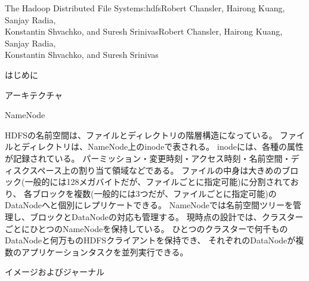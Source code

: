 \begin{aosachaptertoc}{The Hadoop Distributed File System}{s:hdfs}{Robert Chansler, Hairong Kuang, Sanjay Radia, \\ Konstantin Shvachko, and Suresh Srinivas}{Robert Chansler, Hairong Kuang, Sanjay Radia, \\ \hspace*{0.9cm} Konstantin Shvachko, and Suresh Srinivas}
\begin{aosasect1}{はじめに}
\end{aosasect1}

\begin{aosasect1}{アーキテクチャ}

\begin{aosasect2}{NameNode}

HDFSの名前空間は、ファイルとディレクトリの階層構造になっている。
ファイルとディレクトリは、NameNode上のinodeで表される。
inodeには、各種の属性が記録されている。
パーミッション・変更時刻・アクセス時刻・名前空間・ディスクスペース上の割り当て領域などである。
ファイルの中身は大きめのブロック(一般的には128メガバイトだが、ファイルごとに指定可能)に分割されており、
各ブロックを複数(一般的には3つだが、ファイルごとに指定可能)のDataNodeへと個別にレプリケートできる。
NameNodeでは名前空間ツリーを管理し、ブロックとDataNodeの対応も管理する。
現時点の設計では、クラスターごとにひとつのNameNodeを保持している。
ひとつのクラスターで何千ものDataNodeと何万ものHDFSクライアントを保持でき、
それぞれのDataNodeが複数のアプリケーションタスクを並列実行できる。

\end{aosasect2}

\begin{aosasect2}{イメージおよびジャーナル}


\end{aosasect2}
\end{aosasect1}
\end{aosachaptertoc}
